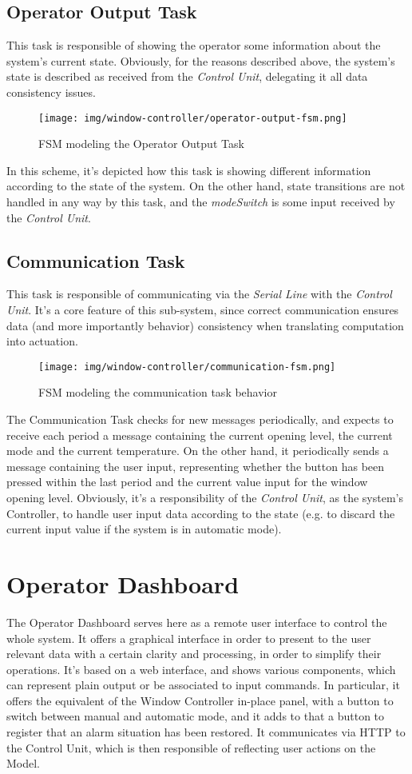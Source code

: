 \documentclass[a4paper,12pt]{report}
\begin{document}
		\subsection{Operator Output Task}
		This task is responsible of showing the operator some information about the system's current state. Obviously, for the reasons described above, the system's state is described as received from the \textit{Control Unit}, delegating it all data consistency issues.
		\begin{figure}[H]
			\centering{}
			\texttt{[image: img/window-controller/operator-output-fsm.png]}
			\caption{FSM modeling the Operator Output Task}
			\label{img:window-controller/operator-output-fsm}
		\end{figure}
		In this scheme, it's depicted how this task is showing different information according to the state of the system. On the other hand, state transitions are not handled in any way by this task, and the \textit{modeSwitch} is some input received by the \textit{Control Unit}.
		\subsection{Communication Task}
		This task is responsible of communicating via the \textit{Serial Line} with the \textit{Control Unit}. It's a core feature of this sub-system, since correct communication ensures data (and more importantly behavior) consistency when translating computation into actuation.
		\begin{figure}[H]
			\centering{}
			\texttt{[image: img/window-controller/communication-fsm.png]}
			\caption{FSM modeling the communication task behavior}
			\label{img:window-controller/communication-fsm}
		\end{figure}
		The Communication Task checks for new messages periodically, and expects to receive each period a message containing the current opening level, the current mode and the current temperature. On the other hand, it periodically sends a message containing the user input, representing whether the button has been pressed within the last period and the current value input for the window opening level. Obviously, it's a responsibility of the \textit{Control Unit}, as the system's Controller, to handle user input data according to the state (e.g. to discard the current input value if the system is in automatic mode).
	\section{Operator Dashboard} %
	The Operator Dashboard serves here as a remote user interface to control the whole system. It offers a graphical interface in order to present to the user relevant data with a certain clarity and processing, in order to simplify their operations. It's based on a web interface, and shows various components, which can represent plain output or be associated to input commands. In particular, it offers the equivalent of the Window Controller in-place panel, with a button to switch between manual and automatic mode, and it adds to that a button to register that an alarm situation has been restored. It communicates via HTTP to the Control Unit, which is then responsible of reflecting user actions on the Model.
\end{document}
